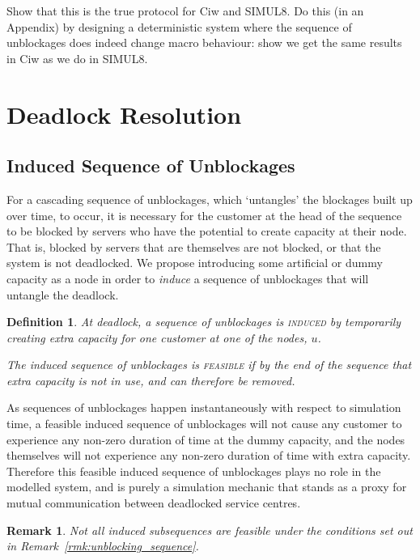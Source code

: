 \documentclass{article}
\newtheorem{definition}{Definition}
\newtheorem{remark}{Remark}
\begin{document}
\begin{tcolorbox}[colback=orange!5!white,colframe=orange!75!black,title=TODO]
Show that this is the true protocol for Ciw and SIMUL8. Do this (in an Appendix)
by designing a deterministic system where the sequence of unblockages does
indeed change macro behaviour: show we get the same results in Ciw as we do in
SIMUL8.
\end{tcolorbox}

\section{Deadlock Resolution}\label{sec:resolution}

\subsection{Induced Sequence of Unblockages}
For a cascading sequence of unblockages, which `untangles' the blockages built
up over time, to occur, it is necessary for the customer at the head of the
sequence to be blocked by servers who have the potential to create capacity at
their node.
That is, blocked by servers that are themselves are not blocked, or that the
system is not deadlocked.
We propose introducing some artificial or dummy capacity as a node in order to
\textit{induce} a sequence of unblockages that will untangle the deadlock.

\begin{definition}
At deadlock, a sequence of unblockages is \textsc{induced} by temporarily
creating extra capacity for one customer at one of the nodes, $u$.

The induced sequence of unblockages is \textsc{feasible} if by the end of the
sequence that extra capacity is not in use, and can therefore be removed.
\end{definition}

As sequences of unblockages happen instantaneously with respect to simulation
time, a feasible induced sequence of unblockages will not cause any customer to
experience any non-zero duration of time at the dummy capacity, and the nodes
themselves will not experience any non-zero duration of time with extra
capacity.
Therefore this feasible induced sequence of unblockages plays no role in the
modelled system, and is purely a simulation mechanic that stands as a proxy for
mutual communication between deadlocked service centres.

\begin{remark}\label{rmk:not_all_feasible}
Not all induced subsequences are feasible under the conditions set out in
Remark~\ref{rmk:unblocking_sequence}.
\end{remark}
\end{document}
